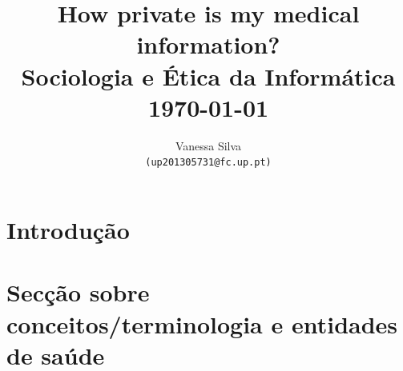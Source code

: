 \documentclass[conference]{IEEEtran}
\begin{document}
%
%

\title{How private is my medical information?\\
	\vspace*{10pt} \large Sociologia e Ética da Informática\\
		\normalsize \today{} }
%
\author{Vanessa Silva\\
	{\texttt{(up201305731@fc.up.pt)}}\\
}

\maketitle



\begin{abstract}


\end{abstract}



\IEEEpeerreviewmaketitle


\section{Introdução}


\section{Secção sobre conceitos/terminologia e entidades de saúde}

\end{document}
